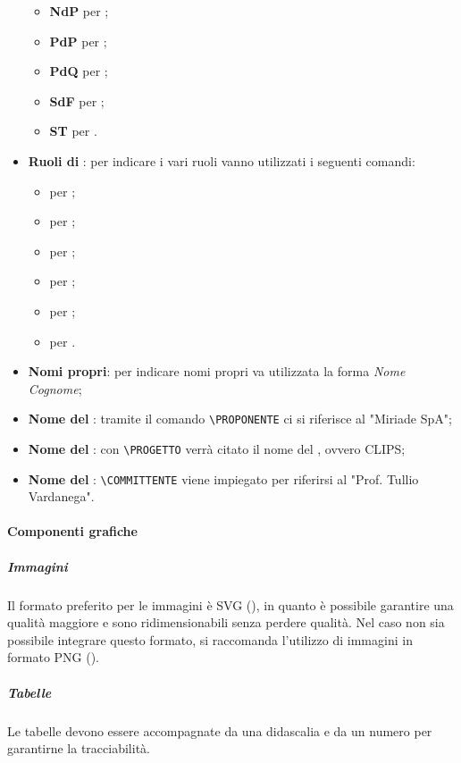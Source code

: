 \begin{itemize}
\begin{itemize}
				\item \textbf{NdP} per \NPdoc;
				\item \textbf{PdP} per \PPdoc;
				\item \textbf{PdQ} per \PQdoc;
				\item \textbf{SdF} per \SFdoc;
				\item \textbf{ST} per \STdoc.
			\end{itemize}	
			\item \textbf{Ruoli di }: per indicare i vari ruoli vanno utilizzati i seguenti comandi:
			\begin{itemize}
				\item {} per \AM;
				\item {} per \AN;
				\item {} per \PR;
				\item {} per \PRJ;
				\item {} per \RES;
				\item {} per \VER.
			\end{itemize}
			\item \textbf{Nomi propri}: per indicare nomi propri va utilizzata la forma \textit{Nome Cognome};
			\item \textbf{Nome del }: tramite il comando \texttt{\textbackslash PROPONENTE} ci si riferisce al  "Miriade SpA";
			\item \textbf{Nome del }: con \texttt{\textbackslash PROGETTO} verrà citato il nome del , ovvero CLIPS;
			\item \textbf{Nome del }: \texttt{\textbackslash COMMITTENTE} viene impiegato per riferirsi al "Prof. Tullio Vardanega".
		\end{itemize}
		
		\paragraph{Componenti grafiche}		
			\subparagraph{Immagini}
			Il formato preferito per le immagini è SVG (), in quanto è possibile garantire una qualità maggiore e sono ridimensionabili senza perdere qualità. Nel caso non sia possibile integrare questo formato, si raccomanda l'utilizzo di immagini in formato PNG ().
			\subparagraph{Tabelle}
			Le tabelle devono essere accompagnate da una didascalia e da un numero  per garantirne la tracciabilità.
		
